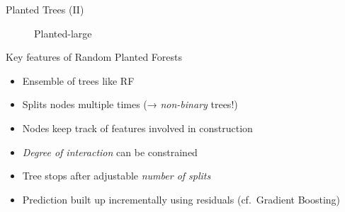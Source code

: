 \documentclass[aspectratio=169,12pt]{beamer}
\providecommand{\tightlist}{%
  \setlength{\itemsep}{2pt}\setlength{\parskip}{0pt}}
\begin{document}
\begin{frame}{Planted Trees (II)}
\label{planted-trees-ii}
\begin{figure}


\caption{\label{fig-planted}Planted-large}

\end{figure}%
\end{frame}

\begin{frame}{Key features of Random Planted Forests}
\label{key-features-of-random-planted-forests}
\begin{itemize}[<+->]
\tightlist
\item
  Ensemble of trees like RF
\item
  Splits nodes multiple times (→ \emph{non-binary} trees!)
\item
  Nodes keep track of features involved in construction
\item
  \emph{Degree of interaction} can be constrained
\item
  Tree stops after adjustable \emph{number of splits}
\item
  Prediction built up incrementally using residuals (cf.~Gradient
  Boosting)
\end{itemize}
\end{frame}
\end{document}
